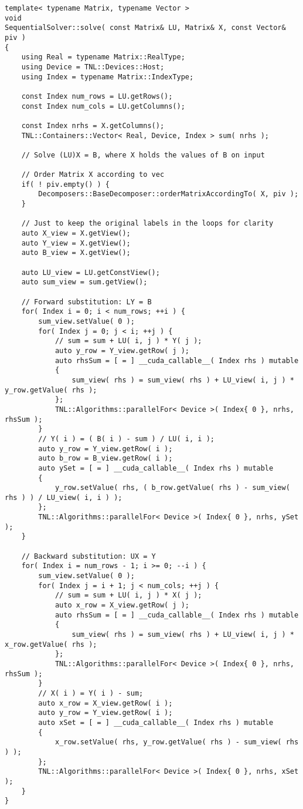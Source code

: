 \begin{lstlisting}[caption={Excerpt from the implementation of SSPP. The code has been slightly modified for brevity, for example, the checks for appropriate sizing of matrices and vectors have been removed.},label={Listing:SSPP-implementation-excerpt}]
template< typename Matrix, typename Vector >
void
SequentialSolver::solve( const Matrix& LU, Matrix& X, const Vector& piv )
{
	using Real = typename Matrix::RealType;
	using Device = TNL::Devices::Host;
	using Index = typename Matrix::IndexType;
	
	const Index num_rows = LU.getRows();
	const Index num_cols = LU.getColumns();
	
	const Index nrhs = X.getColumns();
	TNL::Containers::Vector< Real, Device, Index > sum( nrhs );
	
	// Solve (LU)X = B, where X holds the values of B on input
	
	// Order Matrix X according to vec
	if( ! piv.empty() ) {
		Decomposers::BaseDecomposer::orderMatrixAccordingTo( X, piv );
	}
	
	// Just to keep the original labels in the loops for clarity
	auto X_view = X.getView();
	auto Y_view = X.getView();
	auto B_view = X.getView();
	
	auto LU_view = LU.getConstView();
	auto sum_view = sum.getView();
	
	// Forward substitution: LY = B
	for( Index i = 0; i < num_rows; ++i ) {
		sum_view.setValue( 0 );
		for( Index j = 0; j < i; ++j ) {
			// sum = sum + LU( i, j ) * Y( j );
			auto y_row = Y_view.getRow( j );
			auto rhsSum = [ = ] __cuda_callable__( Index rhs ) mutable
			{
				sum_view( rhs ) = sum_view( rhs ) + LU_view( i, j ) * y_row.getValue( rhs );
			};
			TNL::Algorithms::parallelFor< Device >( Index{ 0 }, nrhs, rhsSum );
		}
		// Y( i ) = ( B( i ) - sum ) / LU( i, i );
		auto y_row = Y_view.getRow( i );
		auto b_row = B_view.getRow( i );
		auto ySet = [ = ] __cuda_callable__( Index rhs ) mutable
		{
			y_row.setValue( rhs, ( b_row.getValue( rhs ) - sum_view( rhs ) ) / LU_view( i, i ) );
		};
		TNL::Algorithms::parallelFor< Device >( Index{ 0 }, nrhs, ySet );
	}
	
	// Backward substitution: UX = Y
	for( Index i = num_rows - 1; i >= 0; --i ) {
		sum_view.setValue( 0 );
		for( Index j = i + 1; j < num_cols; ++j ) {
			// sum = sum + LU( i, j ) * X( j );
			auto x_row = X_view.getRow( j );
			auto rhsSum = [ = ] __cuda_callable__( Index rhs ) mutable
			{
				sum_view( rhs ) = sum_view( rhs ) + LU_view( i, j ) * x_row.getValue( rhs );
			};
			TNL::Algorithms::parallelFor< Device >( Index{ 0 }, nrhs, rhsSum );
		}
		// X( i ) = Y( i ) - sum;		
		auto x_row = X_view.getRow( i );
		auto y_row = Y_view.getRow( i );
		auto xSet = [ = ] __cuda_callable__( Index rhs ) mutable
		{
			x_row.setValue( rhs, y_row.getValue( rhs ) - sum_view( rhs ) );
		};
		TNL::Algorithms::parallelFor< Device >( Index{ 0 }, nrhs, xSet );
	}
}
\end{lstlisting}




